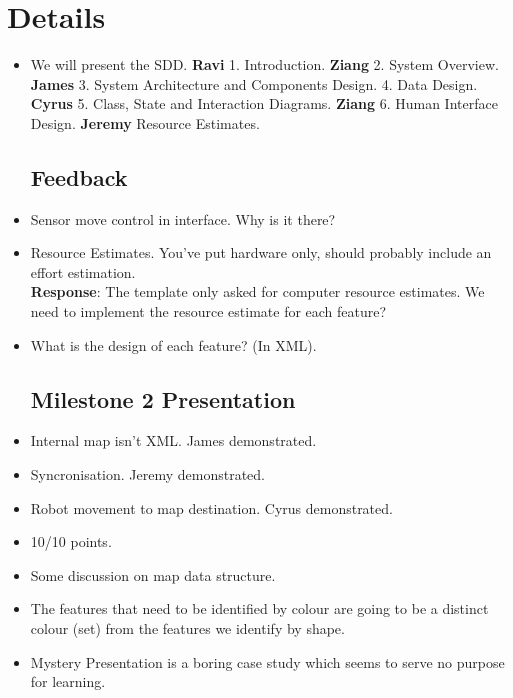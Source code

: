 \documentclass{article}
\begin{document}
\section{Details}
\begin{itemize}
\subsection{SDD Presentation}
\item We will present the SDD. \textbf{Ravi} 1.  Introduction. \textbf{Ziang} 2. System Overview. \textbf{James} 3. System Architecture and Components Design. 4. Data Design. \textbf{Cyrus} 5. Class, State and Interaction Diagrams. \textbf{Ziang} 6. Human Interface Design. \textbf{Jeremy} Resource Estimates.
\subsection{Feedback}
\item Sensor move control in interface. Why is it there?
\item Resource Estimates. You've put hardware only, should probably include an effort estimation.\\ \textbf{Response}: The template only asked for computer resource estimates. We need to implement the resource estimate for each feature?
\item What is the design of each feature? (In XML).

\subsection{Milestone 2 Presentation}
\item Internal map isn't XML. James demonstrated.
\item Syncronisation. Jeremy demonstrated.
\item Robot movement to map destination. Cyrus demonstrated.
\item 10/10 points.
\item Some discussion on map data structure.
\item The features that need to be identified by colour are going to be a distinct colour (set) from the features we identify by shape.
\item Mystery Presentation is a boring case study which seems to serve no purpose for learning.



\end{itemize}
\end{document}
